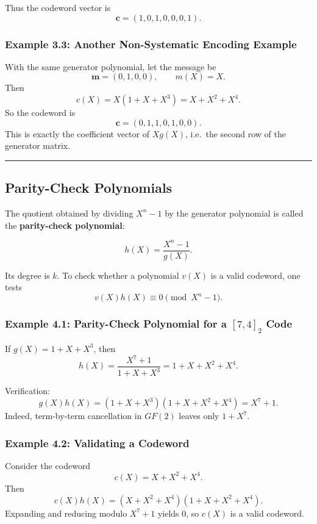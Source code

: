 \documentclass[
]{article}
\begin{document}
Thus the codeword vector is \[\mathbf{c}=(1,0,1,0,0,0,1).\]

\subsubsection{Example 3.3: Another Non-Systematic Encoding
Example}\label{example-3.3-another-non-systematic-encoding-example}

With the same generator polynomial, let the message be
\[\mathbf{m}=(0,1,0,0), \qquad m(X)=X.\] Then
\[c(X)=X(1+X+X^3)=X+X^2+X^4.\] So the codeword is
\[\mathbf{c}=(0,1,1,0,1,0,0).\] This is exactly the coefficient vector
of \(Xg(X)\), i.e.~the second row of the generator matrix.

\begin{center}\rule{0.5\linewidth}{0.5pt}\end{center}

\subsection{Parity-Check Polynomials}\label{what-is-a-parity-check-polynomial}

The quotient obtained by dividing \(X^n-1\) by the generator polynomial
is called the \textbf{parity-check polynomial}:

\[h(X)=\frac{X^n-1}{g(X)}.\]

Its degree is \(k\). To check whether a polynomial \(v(X)\) is a valid
codeword, one tests \[v(X)h(X) \equiv 0 \pmod{X^n-1}.\]

\subsubsection{\texorpdfstring{Example 4.1: Parity-Check Polynomial for
a \([7,4]_2\)
Code}{Example 4.1: Parity-Check Polynomial for a {[}7,4{]}\_2 Code}}\label{example-4.1-parity-check-polynomial-for-a-74_2-code}

If \(g(X)=1+X+X^3\), then \[h(X)=\frac{X^7+1}{1+X+X^3}=1+X+X^2+X^4.\]

Verification: \[g(X)h(X)=(1+X+X^3)(1+X+X^2+X^4)=X^7+1.\] Indeed,
term-by-term cancellation in \(GF(2)\) leaves only \(1+X^7\).

\subsubsection{Example 4.2: Validating a
Codeword}\label{example-4.2-validating-a-codeword}

Consider the codeword \[c(X)=X+X^2+X^4.\] Then
\[c(X)h(X) = (X+X^2+X^4)(1+X+X^2+X^4).\] Expanding and reducing modulo
\(X^7+1\) yields 0, so \(c(X)\) is a valid codeword.
\end{document}
